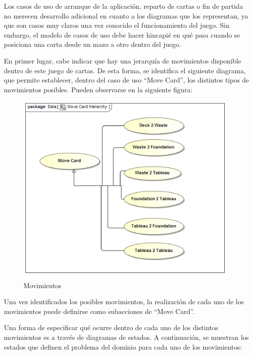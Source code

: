 \documentclass[11pt]{article}
\begin{document}
Los casos de uso de arranque de la aplicación, reparto de cartas o fin de partida no merecen desarrollo adicional en cuanto a los diagramas que los representan, ya que son casos muy claros una vez conocido el funcionamiento del juego. Sin embargo, el modelo de casos de uso debe hacer hincapié en qué pasa cuando se posiciona una carta desde un mazo a otro dentro del juego.

En primer lugar, cabe indicar que hay una jerarquía de movimientos disponible dentro de este juego de cartas. De esta forma, se identifica el siguiente diagrama, que permite establecer, dentro del caso de uso ``Move Card'', los distintos tipos de movimientos posibles. Pueden observarse en la siguiente figura:

\begin{center}
 \begin{figure}[H]
 \begin{center}
   \includegraphics[width=14cm]{DomainModel/MoveCardHierarchy.jpg}
   \caption{Movimientos}
   \label{fig:movements}
 \end{center}
 \end{figure}
\end{center}

Una vez identificados los posibles movimientos, la realización de cada uno de los movimientos puede definirse como subacciones de ``Move Card''.

Una forma de especificar qué ocurre dentro de cada uno de los distintos movimientos es a través de diagramas de estados. A continuación, se muestran los estados que definen el problema del dominio para cada uno de los movimientos:
\end{document}
